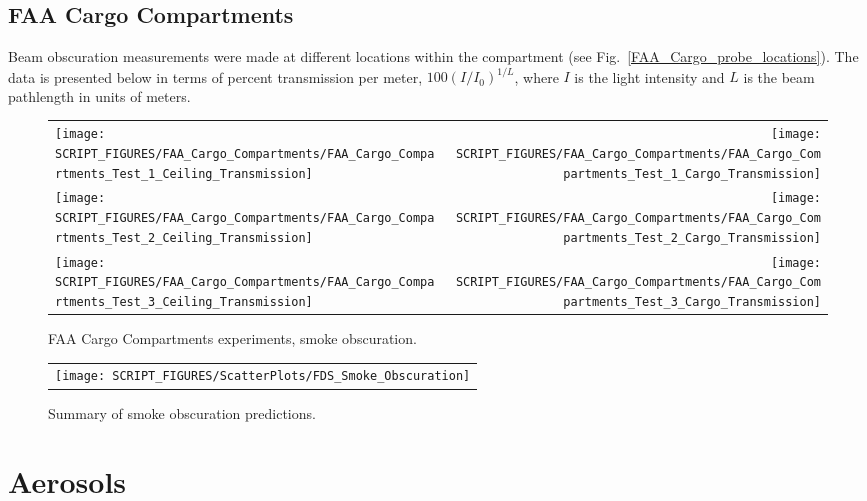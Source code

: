 \clearpage

\subsection{FAA Cargo Compartments}
\label{Smoke Obscuration}

Beam obscuration measurements were made at different locations within the compartment (see Fig.~\ref{FAA_Cargo_probe_locations}). The data is presented below in terms of percent transmission per meter, $100(I/I_0)^{1/L}$, where $I$ is the light intensity and $L$ is the beam pathlength in units of meters.

\begin{figure}[h]
\begin{tabular*}{\textwidth}{l@{\extracolsep{\fill}}r}
\texttt{[image: SCRIPT\_FIGURES/FAA\_Cargo\_Compartments/FAA\_Cargo\_Compartments\_Test\_1\_Ceiling\_Transmission]} &
\texttt{[image: SCRIPT\_FIGURES/FAA\_Cargo\_Compartments/FAA\_Cargo\_Compartments\_Test\_1\_Cargo\_Transmission]} \\
\texttt{[image: SCRIPT\_FIGURES/FAA\_Cargo\_Compartments/FAA\_Cargo\_Compartments\_Test\_2\_Ceiling\_Transmission]} &
\texttt{[image: SCRIPT\_FIGURES/FAA\_Cargo\_Compartments/FAA\_Cargo\_Compartments\_Test\_2\_Cargo\_Transmission]} \\
\texttt{[image: SCRIPT\_FIGURES/FAA\_Cargo\_Compartments/FAA\_Cargo\_Compartments\_Test\_3\_Ceiling\_Transmission]} &
\texttt{[image: SCRIPT\_FIGURES/FAA\_Cargo\_Compartments/FAA\_Cargo\_Compartments\_Test\_3\_Cargo\_Transmission]}
\end{tabular*}
\caption[FAA Cargo Compartments experiments, smoke obscuration]{FAA Cargo Compartments experiments, smoke obscuration.}
\end{figure}

\newpage

\begin{figure}[p]
\begin{center}
\begin{tabular}{c}
\texttt{[image: SCRIPT\_FIGURES/ScatterPlots/FDS\_Smoke\_Obscuration]}
\end{tabular}
\end{center}
\caption[Summary of smoke obscuration predictions]{Summary of smoke obscuration predictions.}
\end{figure}


\clearpage

\section{Aerosols}

